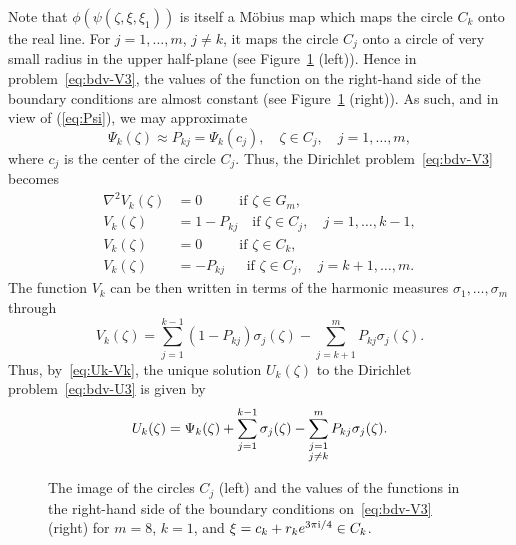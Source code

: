 Note that $\phi(\psi(\zeta,\xi,\xi_1))$ is itself a M\"obius map which maps the circle $C_k$ onto the real line. For $j=1,\ldots,m$, $j\ne k$, it  maps the circle $C_j$ onto a circle of very small radius in the upper half-plane (see Figure~\ref{fig:small} (left)). Hence in problem~\eqref{eq:bdv-V3}, the values of the function on the right-hand side of the boundary conditions are almost constant (see Figure~\ref{fig:small} (right)). As such, and in view of (\ref{eq:Psi}), we may approximate
\begin{equation}
\Psi_k(\zeta) \approx P_{kj}= \Psi_k(c_j), \quad \zeta \in C_j, \quad j=1,\ldots,m,
\end{equation} 
where $c_j$ is the center of the circle $C_j$. Thus, the Dirichlet problem~\eqref{eq:bdv-V3} becomes
\begin{subequations}\label{eq:bdv-V23}
	\begin{align}
	\label{eq:V23-Lap}
	\nabla^2 V_k(\zeta) &= 0 ~~~~~~~~~~\:\: \mbox{if }\zeta\in G_m, \\
	\label{eq:V23-m}
	V_k(\zeta)&= 1-P_{kj} \quad \mbox{if }\zeta\in C_j, \quad j=1,\ldots,k-1, \\
	\label{eq:V23-k'}
	V_k(\zeta)&= 0 ~~~~~~~~~~\:\: \mbox{if }\zeta\in C_k,  \\
	\label{eq:V23-p}
	V_k(\zeta)&= -P_{kj}  ~~~~\:\:\: \mbox{if }\zeta\in C_j, \quad j=k+1,\ldots,m. 
	\end{align}
\end{subequations}
The function $V_k$ can be then written in terms of the harmonic measures $\sigma_1,\ldots,\sigma_m$ through
\[
V_k(\zeta)=\sum_{j=1}^{k-1} (1-P_{kj})\sigma_j(\zeta)-\sum_{j=k+1}^{m} P_{kj}\sigma_j(\zeta).
\]
Thus, by~\eqref{eq:Uk-Vk}, the unique solution $U_k(\zeta)$ to the Dirichlet problem~\eqref{eq:bdv-U3} is given by
\begin{equation}\label{eq:U_k}
	U_k(\zeta) = \Psi_k(\zeta)+\sum_{j=1}^{k-1} \sigma_j(\zeta) -\sum_{\begin{subarray}{c} j=1\\j\ne k\end{subarray}}^{m} P_{kj}\sigma_j(\zeta).
\end{equation}


\begin{figure}[htb] %
	\centerline{\hfill
		\hfill
		\hfill
	}
	\caption{The image of the circles $C_j$ (left) and the values of the functions in the right-hand side of the boundary conditions on~\eqref{eq:bdv-V3} (right) for $m=8$, $k=1$, and $\xi=c_k+r_k e^{3\pi\mathrm{i}/4}\in C_k$.}
	\label{fig:small}
\end{figure}

